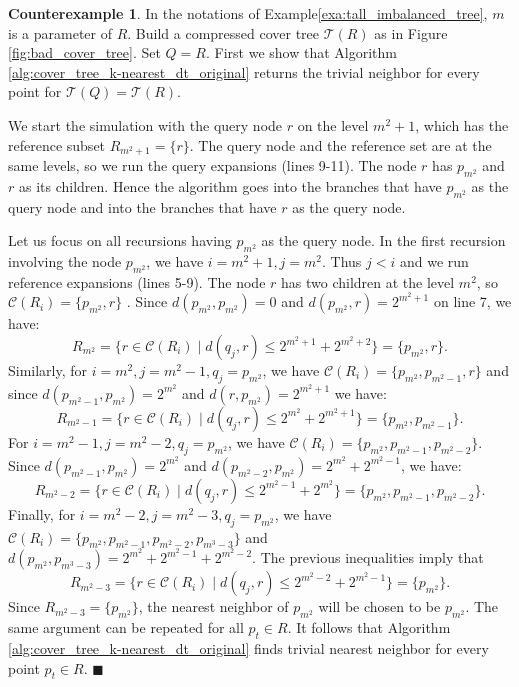 \documentclass[a4paper,UKenglish,cleveref, autoref]{lipics-v2019}
\numberwithin{algocf}{section}
\theoremstyle{definition}
\theoremstyle{definition}
\theoremstyle{definition}
\newtheorem{cexa}[algocf]{Counterexample}
\theoremstyle{plain}
\newcommand{\C}{\mathcal{C}}
\newcommand{\T}{\mathcal{T}}
\newcommand{\bs}{\hfill $\blacksquare$}
\begin{document}
\begin{cexa}
\label{cexa:dualtreecode}
In the notations of  Example\ref{exa:tall_imbalanced_tree}, $m$ is a parameter of $R$.
Build a compressed cover tree $\T(R)$ as in Figure \ref{fig:bad_cover_tree}. 
Set $Q = R$. 
First we show that Algorithm \ref{alg:cover_tree_k-nearest_dt_original} returns the trivial neighbor for every point for $\T(Q)=\T(R)$. 
\medskip

We start the simulation with the query node $r$ on the level $m^2+1$, which has the reference subset $R_{m^2+1} = \{r\}$. 
The query node and the reference set are at the same levels, so we run the query expansions (lines 9-11). 
The node $r$ has $p_{m^2}$ and $r$ as its children.
Hence the algorithm goes into the branches that have $p_{m^2}$ as the query node and into the branches that have $r$ as the query node.
\medskip

 Let us focus on all recursions having $p_{m^2}$ as the query node. In the first recursion involving the node $p_{m^2}$, we have $i = m^2+1, j = m^2$. Thus $j < i$ and we run reference expansions (lines 5-9). 
The node $r$ has two children at the level $m^2$, so $\C(R_i) = \{p_{m^2}, r\}$ . Since
$d(p_{m^2},p_{m^2}) = 0$ and $d(p_{m^2}, r) = 2^{m^2+1}$ on line 7, we have:
$$R_{m^2}  = \{r \in \C(R_i) \mid d(q_j,r) \leq 2^{m^2 + 1} + 2^{m^2+2} \} = \{p_{m^2}, r\}.$$
Similarly, for $i = m^2, j = m^2-1, q_j = p_{m^2}$, we have $\C(R_i) =  \{p_{m^2}, p_{m^2-1}, r\}$ and since $d(p_{m^2 - 1}, p_{m^2}) = 2^{m^2}$ and $d(r,p_{m^2}) = 2^{m^2 + 1}$ we have:
$$R_{m^2-1} =  \{r \in \C(R_i) \mid d(q_j,r) \leq 2^{m^2} + 2^{m^{2} + 1} \} = \{p_{m^2}, p_{m^2-1}\}. $$
For $i = m^2-1, j = m^2-2, q_j = p_{m^2}$, we have $\C(R_i) =  \{p_{m^2}, p_{m^2-1}, p_{m^2-2}\}$.
Since $d(p_{m^2 - 1}, p_{m^2}) = 2^{m^2}$ and $d(p_{m^2-2},p_{m^2}) = 2^{m^2} + 2^{m^2-1}$, we have:
$$R_{m^2-2} =  \{r \in \C(R_i) \mid d(q_j,r) \leq 2^{m^2 - 1} + 2^{m^{2}} \} = \{p_{m^2}, p_{m^2-1}, p_{m^2-2}\}.$$
Finally, for $i = m^2-2, j = m^2-3, q_j = p_{m^2}$, we have $\C(R_i) =  \{p_{m^2}, p_{m^2-1},p_{m^2-2}, p_{m^3-3}\}$ and 
$d(p_{m^2}, p_{m^3-3}) = 2^{m^2} + 2^{m^2-1} + 2^{m^2-2}$. The previous inequalities imply that
$$R_{m^2-3} =  \{r \in \C(R_i) \mid d(q_j,r) \leq 2^{m^2-2} + 2^{m^{2}-1} \} = \{p_{m^2}\}.$$
Since  $R_{m^2 -3} = \{p_{m^2}\}$, the nearest neighbor of $p_{m^2}$ will be chosen to be $p_{m^2}$. 
The same argument can be repeated for all $p_t \in R$. 
It follows that Algorithm \ref{alg:cover_tree_k-nearest_dt_original} finds trivial nearest neighbor for every point $p_t \in R$. 
\bs
\end{cexa}
\end{document}
